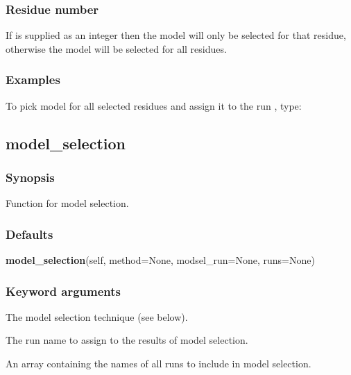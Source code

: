 \subsubsection{Residue number}

If  is supplied as an integer then the model will only be selected for that residue, otherwise the model will be selected for all residues.



\subsubsection{Examples}

To pick model  for all selected residues and assign it to the run , type:






\newpage

\subsection{model\_selection}


\subsubsection{Synopsis}

Function for model selection.



\subsubsection{Defaults}

\textsf{\textbf{model\_selection}(self, method=None, modsel\_run=None, runs=None)}


\subsubsection{Keyword arguments}

  The model selection technique (see below). 

  The run name to assign to the results of model selection. 

  An array containing the names of all runs to include in model selection. 




